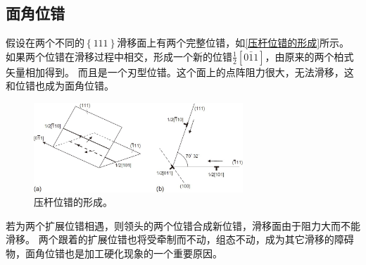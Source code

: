             \subsection{面角位错}
                
                假设在两个不同的$\left\{ 111\right\}$滑移面上有两个完整位错，如\autoref{压杆位错的形成}所示。
                如果两个位错在滑移过程中相交，形成一个新的位错$\frac{1}{2}[0\bar{1}1]$，由原来的两个柏式矢量相加得到。
                而且是一个刃型位错。这个面上的点阵阻力很大，无法滑移，这和位错也成为面角位错。
                \begin{figure}[ht]
                    \centering
                    \includegraphics[width=0.7\textwidth]{fig/Formation_of_a_Lomer_sessile_dislocation.jpg}
                    \caption{压杆位错的形成。}
                    \label{压杆位错的形成}
                \end{figure}

                若为两个扩展位错相遇，则领头的两个位错合成新位错，滑移面由于阻力大而不能滑移。
                两个跟着的扩展位错也将受牵制而不动，组态不动，成为其它滑移的障碍物，面角位错也是加工硬化现象的一个重要原因。